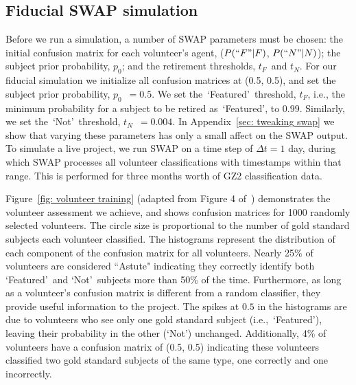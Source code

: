 \documentclass[twocolumn,  trackchanges, ]{aastex6}%
\newcommand{\Pf}{$P(``F"|F)$}
\newcommand{\Pn}{$P(``N"|N)$}
\newcommand{\p}{$p_0$}
\newcommand{\tf}{$t_F$}
\newcommand{\tn}{$t_N$}
\newcommand{\feat}{`Featured'}
\newcommand{\notfeat}{`Not'}
\begin{document}
\subsection{Fiducial SWAP simulation}\label{sec: fiducial}

Before we run a simulation, a number of SWAP parameters must be chosen:  the initial confusion matrix for each volunteer's agent, (\Pf, \Pn); the subject prior probability, \p; and the retirement thresholds, \tf~and \tn. For our fiducial  simulation we initialize all confusion matrices at (0.5, 0.5), and set the subject prior probability, \p~$= 0.5$. We set  the~\feat~threshold, \tf, i.e., the minimum probability for a subject to be retired as~\feat, to $0.99$. Similarly, we set the~\notfeat~threshold, \tn~$= 0.004$. In Appendix~\ref{sec: tweaking swap} we show that varying these parameters has only a small affect on the SWAP output. To simulate a live project, we run SWAP on a time step of $\Delta t = 1$ day, during which SWAP processes all volunteer classifications with timestamps within that range. This is performed for three months worth of GZ2 classification data. 

Figure~\ref{fig: volunteer training} (adapted from Figure 4 of~\citealt{Marshall2016}) demonstrates the volunteer assessment we achieve, and shows confusion matrices for 1000 randomly selected volunteers. The circle size is proportional to the number of gold standard subjects each volunteer classified. The histograms represent the distribution of each component of the confusion matrix for all volunteers. Nearly 25\% of volunteers are considered ``Astute"  indicating they correctly identify both \feat~and \notfeat~subjects more than 50\% of the time. Furthermore, as long as a volunteer's confusion matrix is different from a random classifier, they provide useful information to the project. The spikes at $0.5$ in the histograms are due to volunteers who see only one gold standard subject (i.e.,~\feat), leaving their probability in the other (\notfeat) unchanged. Additionally, 4\% of volunteers have a confusion matrix of (0.5, 0.5) indicating these volunteers classified two gold standard subjects of the same type, one correctly and one incorrectly. 
\end{document}
